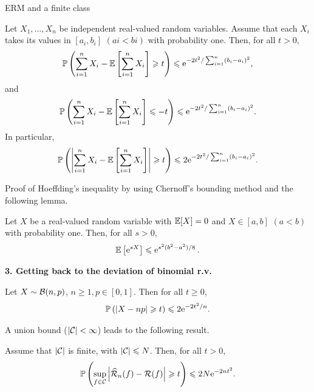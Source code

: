 \documentclass[xcolor={usenames,dvipsnames},handout]{beamer}
\begin{document}
\begin{frame}{ERM and a finite class}
\begin{theorem} 
{\small
Let $X_1, \hdots , X_n$ be independent real-valued random variables. Assume that each $X_i$ takes its values in $[a_i , b_i ]$ $(ai < bi )$ with probability one. Then, for all $t > 0$,
$$
\P \left( \sum_{i=1}^n X_i - \E \left[\sum_{i=1}^n X_i\right]  \geq t \right) \leq \mathrm{e}^{-2t^2 / \sum_{i=1}^n (b_i -a_i)^2},
$$
and 
$$
\P \left( \sum_{i=1}^n X_i - \E \left[\sum_{i=1}^n X_i\right]  \leq -t \right) \leq \mathrm{e}^{-2t^2 / \sum_{i=1}^n (b_i -a_i)^2}.
$$
In particular,
$$ 
\P \left( \left|  \sum_{i=1}^n X_i - \E \left[\sum_{i=1}^n X_i \right] \right| \geq t \right)  \leq 2 \mathrm{e}^{-2t^2 / \sum_{i=1}^n (b_i -a_i)^2}.
$$}
\end{theorem}
\end{frame}
\begin{frame}
Proof of Hoeffding's inequality by using Chernoff's bounding method and the following lemma.
\begin{lemma}\label{lem:for_hoeffding}
Let $X$ be a real-valued random variable with $\E [X] = 0$ and $X\in [ a, b ]$ $(a < b)$ with probability one. Then, for all $s > 0$,
$$
\E \left[\mathrm{e}^{sX}\right] \leq \mathrm{e}^{s^2(b^2-a^2)/8}\,.
$$
\end{lemma}

\vspace{.3cm}

\end{frame}

\begin{frame}
 \textbf{3. Getting back to the deviation of binomial r.v.\ }
{\small
\begin{corollary}
Let $X \sim \Bc(n,p)$, $n \geq 1, p \in [0,1]$. Then for all $t\geq 0$,
$$
\P \left( \left| X- np \right| \geq t \right) \leq 2 \mathrm{e}^{-2t^2/n}.
$$
\end{corollary}}
A union bound ($|\Cc|<\infty$) leads to the following result.
\begin{theorem}
\label{thm:C_finie}
Assume that $|\Cc| $ is finite, with $|\Cc| \leq N$. Then, for all $t > 0$,
$$
\P \left( \sup_{f\in \Cc} \left| \widehat{\Rc}_n(f) - \Rc(f)  \right| \geq t  \right) \leq 2N \mathrm{e}^{-2nt^2}.
$$
\end{theorem}
\end{frame}
\end{document}
